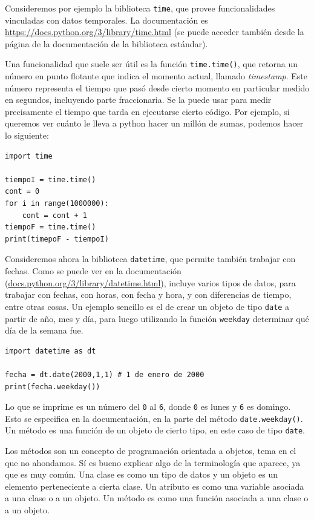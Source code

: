 \documentclass[a4paper, 12pt]{report}
\theoremstyle{definition}
\begin{document}
Consideremos por ejemplo la biblioteca {\tt time}, que provee funcionalidades vinculadas con datos temporales. La documentación es \href{https://docs.python.org/3/library/time.html}{https://docs.python.org/3/library/time.html} (se puede acceder también desde la página de la documentación de la biblioteca estándar).

Una funcionalidad que suele ser útil es la función {\tt time.time()}, que retorna un número en punto flotante que indica el momento actual, llamado {\sl timestamp}. Este número representa el tiempo que pasó desde cierto momento en particular medido en segundos, incluyendo parte fraccionaria. Se la puede usar para medir precisamente el tiempo que tarda en ejecutarse cierto código. Por ejemplo, si queremos ver cuánto le lleva a python hacer un millón de sumas, podemos hacer lo siguiente:
\begin{verbatim}
import time

tiempoI = time.time()
cont = 0
for i in range(1000000):
    cont = cont + 1
tiempoF = time.time()
print(timepoF - tiempoI)
\end{verbatim}

\vspace{1em}
Consideremos ahora la biblioteca {\tt datetime}, que permite también trabajar con fechas. Como se puede ver en la documentación (\href{https://docs.python.org/3/library/datetime.html}{docs.python.org/3/library/datetime.html}), incluye varios tipos de datos, para trabajar con fechas, con horas, con fecha y hora, y con diferencias de tiempo, entre otras cosas. Un ejemplo sencillo es el de crear un objeto de tipo {\tt date} a partir de año, mes y día, para luego utilizando la función {\tt weekday} determinar qué día de la semana fue.
\begin{verbatim}
import datetime as dt

fecha = dt.date(2000,1,1) # 1 de enero de 2000
print(fecha.weekday())
\end{verbatim}
Lo que se imprime es un número del {\tt 0} al {\tt 6}, donde {\tt 0} es lunes y {\tt 6} es domingo. Esto se especifica en la documentación, en la parte del método {\tt date.weekday()}. Un método es una función de un objeto de cierto tipo, en este caso de tipo {\tt date}.

Los métodos son un concepto de programación orientada a objetos, tema en el que no ahondamos. Sí es bueno explicar algo de la terminología que aparece, ya que es muy común. Una clase es como un tipo de datos y un objeto es un elemento perteneciente a cierta clase. Un atributo es como una variable asociada a una clase o a un objeto. Un método es como una función asociada a una clase o a un objeto.
\end{document}
